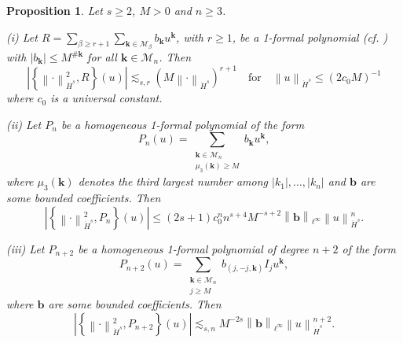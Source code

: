 \documentclass[a4paper,10pt,reqno]{article}
\theoremstyle{definition}
\theoremstyle{plain}
\theoremstyle{plain}
\theoremstyle{definition}
\theoremstyle{plain}
\theoremstyle{plain}
\newtheorem{prop}[definition]{Proposition}
\theoremstyle{plain}
\theoremstyle{definition}
\theoremstyle{definition}
\newcommand{\norm}[1]{\left\lVert #1 \right\rVert}
\def \M{\mathcal{M}}
\def \k{\bm{k}}
\begin{document}
\begin{prop} \label{prop: controllo resti}
Let $s \ge 2$, $M > 0$ and $n \ge 3$. 

\medskip

\noindent (i) Let $R = \sum_{\beta \ge r+1} \sum_{\k \in \M_\beta} b_{\k} u^{\k}$, with $r \ge 1$, be a 1-formal polynomial (cf. ) with $|b_{\k}| \le M^{\#\k}$ for all $\k \in \M_n$. 
Then
\[
\left \lvert \left \{ \norm{\cdot}_{\dot{H}^s}^2 , R \right \} (u) \right \rvert \lesssim_{s,r} \left ( M \norm{\cdot}_{\dot{H}^s} \right )^{r+1} \quad \text{for} \quad \norm{u}_{\dot{H}^s} \le \left ( 2 c_0 M \right )^{-1}
\]
where $c_0$ is a universal constant.

\medskip

\noindent (ii) Let $P_n$ be a homogeneous 1-formal polynomial of the form 
\begin{equation}\label{hom_pol}
P_n(u) = \sum_{ \substack{ \k \in \M_n \\ \mu_3(\k) \ge M } } b_{\k} u^{\k},
\end{equation}
where $\mu_3(\k)$ denotes the third largest number among $|k_1|,\ldots,|k_n|$ and $\bm{b}$ are some bounded coefficients. Then
\begin{equation}\label{hom_pol_bound}
\left \lvert \left \{ \norm{\cdot}_{\dot{H}^s}^2 , P_n \right \} (u) \right \rvert \le (2s+1) c_0^n n^{s+4} M^{-s+2} \norm{\bm{b}}_{\ell^{\infty}} \norm{u}_{\dot{H}^s}^n.
\end{equation}

\medskip

\noindent (iii) Let $P_{n+2}$ be a homogeneous 1-formal polynomial of degree $n+2$ of the form
\[
P_{n+2}(u) = \sum_{ \substack{ \k \in \M_n \\ j \ge M } } b_{(j,-j,\k)} I_j u^{\k},
\]
where $\bm{b}$ are some bounded coefficients. Then
\[
\left \lvert \left \{ \norm{\cdot}_{\dot{H}^s}^2 , P_{n+2} \right \} (u) \right \rvert \lesssim_{s,n} M^{-2s} \norm{\bm{b}}_{\ell^{\infty}} \norm{u}_{\dot{H}^s}^{n+2}.
\]
\end{prop}
\end{document}
